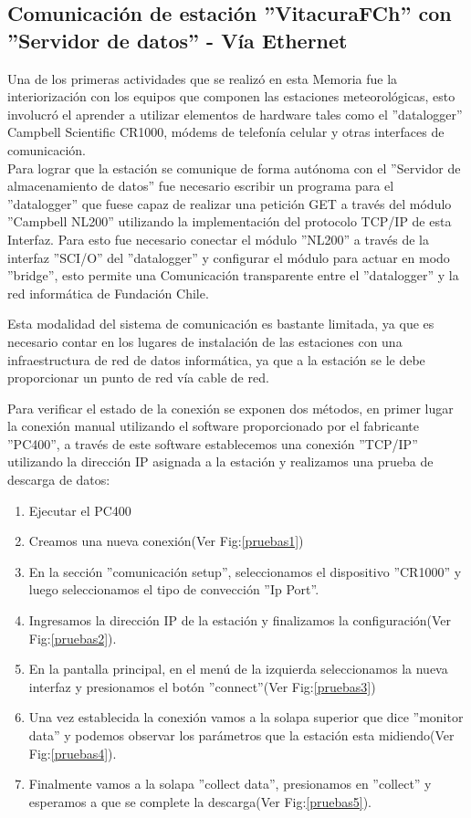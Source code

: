 \subsection{Comunicación de estación ''VitacuraFCh'' con ''Servidor de datos'' - Vía Ethernet}
Una de los primeras actividades que se realizó en esta Memoria fue la interiorización con los equipos que componen las estaciones meteorológicas, esto involucró el aprender a utilizar elementos de hardware tales como el ''datalogger'' Campbell Scientific CR1000, módems de telefonía celular y otras interfaces de comunicación.\\
Para lograr que la estación se comunique de forma autónoma con el ''Servidor de almacenamiento de datos'' fue necesario escribir un programa para el ''datalogger'' que fuese capaz de realizar una petición GET a través del módulo ''Campbell NL200'' utilizando la implementación del protocolo TCP/IP de esta Interfaz.
Para esto fue necesario conectar el módulo ''NL200'' a través de la interfaz ''SCI/O'' del ''datalogger'' y configurar el módulo para actuar en modo ''bridge'', esto permite una Comunicación transparente entre el ''datalogger'' y la red informática de Fundación Chile.

Esta modalidad del sistema de comunicación es bastante limitada, ya que es necesario contar en los lugares de instalación de las estaciones con una infraestructura de red de datos informática, ya que a la estación se le debe proporcionar un punto de red vía cable de red.

Para verificar el estado de la conexión se exponen dos métodos, en primer lugar la conexión manual utilizando el software proporcionado por el fabricante ''PC400'', a través de este software establecemos una conexión ''TCP/IP'' utilizando la dirección IP asignada a la estación y realizamos una prueba de descarga de datos:

\begin{enumerate}
\item Ejecutar el PC400
\item Creamos una nueva conexión(Ver Fig:\ref{pruebas1}) 
\item En la sección ''comunicación setup'', seleccionamos el dispositivo ''CR1000'' y luego seleccionamos el tipo de convección ''Ip Port''.
\item Ingresamos la dirección IP de la estación y finalizamos la configuración(Ver Fig:\ref{pruebas2}).
\item En la pantalla principal, en el menú de la izquierda seleccionamos la nueva interfaz y presionamos el botón ''connect''(Ver Fig:\ref{pruebas3})
\item Una vez establecida la conexión vamos a la solapa superior que dice ''monitor data'' y podemos observar los parámetros que la estación esta midiendo(Ver Fig:\ref{pruebas4}).
\item Finalmente vamos a la solapa ''collect data'', presionamos en ''collect'' y esperamos a que se complete la descarga(Ver Fig:\ref{pruebas5}).
\end{enumerate}

